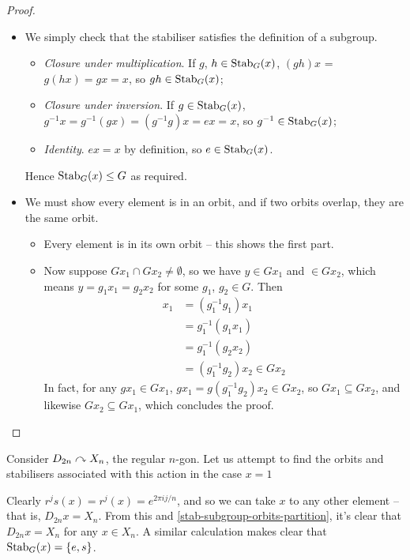 \documentclass{../../template/note}
\begin{document}
    \begin{proof}
        \begin{itemize}
            \item We simply check that the stabiliser satisfies the definition of a subgroup.
            \begin{itemize}
                \item \emph{Closure under multiplication}. If \(g\), \(h \in \operatorname{Stab}_G(x)\), \((gh)x\) = \(g(hx) = gx = x\), so \(gh \in \operatorname{Stab}_G(x)\);
                \item \emph{Closure under inversion}. If \(g \in \operatorname{Stab}_G(x)\), \(g^{-1}x = g^{-1}(gx) = (g^{-1}g)x = ex = x\), so \(g^{-1} \in \operatorname{Stab}_G(x)\);
                \item \emph{Identity}. \(ex = x\) by definition, so \(e \in \operatorname{Stab}_G(x)\).
            \end{itemize}
            Hence \(\operatorname{Stab}_G(x) \leq G\) as required.
            \item We must show every element is in an orbit, and if two orbits overlap, they are the same orbit.
            \begin{itemize}
                \item Every element is in its own orbit -- this shows the first part.
                \item Now suppose \(Gx_1 \cap Gx_2 \neq \emptyset\), so we have \(y \in Gx_1\) and \(\in Gx_2\), which means \(y = g_1x_1 = g_2x_2\) for some \(g_1\), \(g_2 \in G\). Then
                \begin{align*}
                    x_1 &= (g_1^{-1}g_1)x_1 \\
                    &= g_1^{-1} (g_1x_1) \\
                    &= g_1^{-1} (g_2x_2) \\
                    &= (g_1^{-1}g_2) x_2 \in Gx_2
                \end{align*}
                In fact, for any \(gx_1 \in Gx_1\), \(gx_1 = g(g_1^{-1}g_2)x_2 \in Gx_2\), so \(Gx_1 \subseteq Gx_2\), and likewise \(Gx_2 \subseteq Gx_1\), which concludes the proof.
            \end{itemize}
        \end{itemize}
    \end{proof}
    
    \begin{example*}
        Consider \(D_{2n} \curvearrowright X_n\), the regular \(n\)-gon. Let us attempt to find the orbits and stabilisers associated with this action in the case \(x=1\)

        Clearly \(r^js(x) = r^j(x) = e^{2 \pi i j/n}\), and so we can take \(x\) to any other element -- that is, \(D_{2n}x = X_n\). From this and \cref{stab-subgroup-orbits-partition}, it's clear that \(D_{2n}x = X_n\) for any \(x \in X_n\).  A similar calculation makes clear that \(\operatorname{Stab}_G(x) = \{e, s\}\).
    \end{example*}
    
\end{document}

